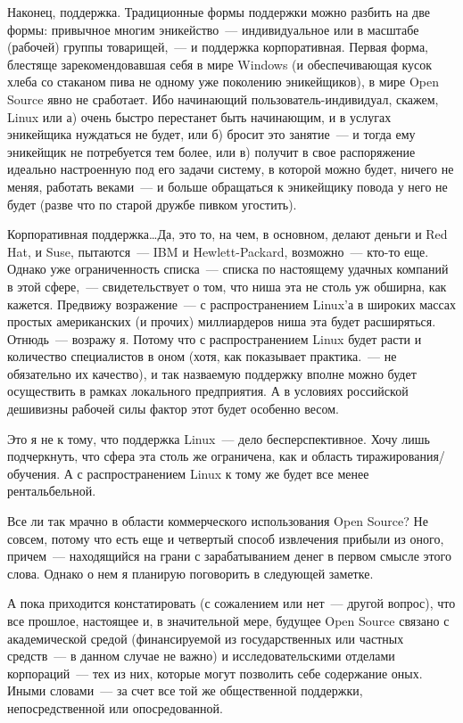 Наконец, поддержка. Традиционные формы поддержки можно разбить на две формы: привычное многим эникейство~--- индивидуальное или в масштабе (рабочей) группы товарищей,~--- и поддержка корпоративная. Первая форма, блестяще зарекомендовавшая себя в мире Windows (и обеспечивающая кусок хлеба со стаканом пива не одному уже поколению эникейщиков), в мире Open Source явно не сработает. Ибо начинающий пользователь-индивидуал, скажем, Linux или а) очень быстро перестанет быть начинающим, и в услугах эникейщика нуждаться не будет, или б) бросит это занятие~--- и тогда ему эникейщик не потребуется тем более, или в) получит в свое распоряжение идеально настроенную под его задачи систему, в которой можно будет, ничего не меняя, работать веками~--- и больше обращаться к эникейщику повода у него не будет (разве что по старой дружбе пивком угостить).

Корпоративная поддержка\dots Да, это то, на чем, в основном, делают деньги и Red Hat, и Suse, пытаются~--- IBM и Hewlett-Packard, возможно~--- кто-то еще. Однако уже ограниченность списка~--- списка по настоящему удачных компаний в этой сфере,~--- свидетельствует о том, что ниша эта не столь уж обширна, как кажется. Предвижу возражение~--- с распространением Linux'а в широких массах простых американских (и прочих) миллиардеров ниша эта будет расширяться. Отнюдь~--- возражу я. Потому что с распространением Linux будет расти и количество специалистов в оном (хотя, как показывает практика.~--- не обязательно их качество), и так назваемую поддержку вполне можно будет осуществить в рамках локального предприятия. А в условиях российской дешивизны рабочей силы фактор этот будет особенно весом.

Это я не к тому, что поддержка Linux~--- дело бесперспективное. Хочу лишь подчеркнуть, что сфера эта столь же ограничена, как и область тиражирования/обучения. А с распространением Linux к тому же будет все менее рентальбельной.

Все ли так мрачно в области коммерческого использования Open Source? Не совсем, потому что есть еще и четвертый способ извлечения прибыли из оного, причем~--- находящийся на грани с зарабатыванием денег в первом смысле этого слова. Однако о нем я планирую поговорить в следующей заметке.

А пока приходится констатировать (с сожалением или нет~--- другой вопрос), что все прошлое, настоящее и, в значительной мере, будущее Open Source связано с академической средой (финансируемой из государственных или частных средств~--- в данном случае не важно) и исследовательскими отделами корпораций~--- тех из них, которые могут позволить себе содержание оных. Иными словами~--- за счет все той же общественной поддержки, непосредственной или опосредованной.

